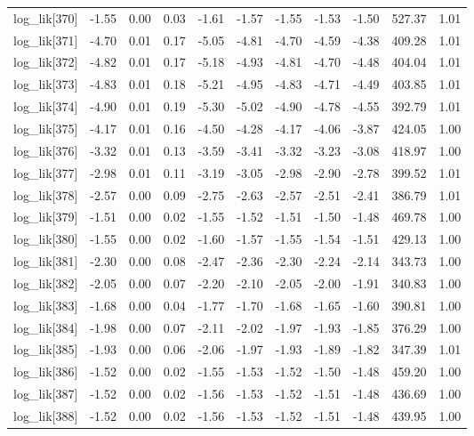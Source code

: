 \begin{table}[ht]
\begin{tabular}{rrrrrrrrrrr}
  log\_lik[370] & -1.55 & 0.00 & 0.03 & -1.61 & -1.57 & -1.55 & -1.53 & -1.50 & 527.37 & 1.01 \\ 
  log\_lik[371] & -4.70 & 0.01 & 0.17 & -5.05 & -4.81 & -4.70 & -4.59 & -4.38 & 409.28 & 1.01 \\ 
  log\_lik[372] & -4.82 & 0.01 & 0.17 & -5.18 & -4.93 & -4.81 & -4.70 & -4.48 & 404.04 & 1.01 \\ 
  log\_lik[373] & -4.83 & 0.01 & 0.18 & -5.21 & -4.95 & -4.83 & -4.71 & -4.49 & 403.85 & 1.01 \\ 
  log\_lik[374] & -4.90 & 0.01 & 0.19 & -5.30 & -5.02 & -4.90 & -4.78 & -4.55 & 392.79 & 1.01 \\ 
  log\_lik[375] & -4.17 & 0.01 & 0.16 & -4.50 & -4.28 & -4.17 & -4.06 & -3.87 & 424.05 & 1.00 \\ 
  log\_lik[376] & -3.32 & 0.01 & 0.13 & -3.59 & -3.41 & -3.32 & -3.23 & -3.08 & 418.97 & 1.00 \\ 
  log\_lik[377] & -2.98 & 0.01 & 0.11 & -3.19 & -3.05 & -2.98 & -2.90 & -2.78 & 399.52 & 1.01 \\ 
  log\_lik[378] & -2.57 & 0.00 & 0.09 & -2.75 & -2.63 & -2.57 & -2.51 & -2.41 & 386.79 & 1.01 \\ 
  log\_lik[379] & -1.51 & 0.00 & 0.02 & -1.55 & -1.52 & -1.51 & -1.50 & -1.48 & 469.78 & 1.00 \\ 
  log\_lik[380] & -1.55 & 0.00 & 0.02 & -1.60 & -1.57 & -1.55 & -1.54 & -1.51 & 429.13 & 1.00 \\ 
  log\_lik[381] & -2.30 & 0.00 & 0.08 & -2.47 & -2.36 & -2.30 & -2.24 & -2.14 & 343.73 & 1.00 \\ 
  log\_lik[382] & -2.05 & 0.00 & 0.07 & -2.20 & -2.10 & -2.05 & -2.00 & -1.91 & 340.83 & 1.00 \\ 
  log\_lik[383] & -1.68 & 0.00 & 0.04 & -1.77 & -1.70 & -1.68 & -1.65 & -1.60 & 390.81 & 1.00 \\ 
  log\_lik[384] & -1.98 & 0.00 & 0.07 & -2.11 & -2.02 & -1.97 & -1.93 & -1.85 & 376.29 & 1.00 \\ 
  log\_lik[385] & -1.93 & 0.00 & 0.06 & -2.06 & -1.97 & -1.93 & -1.89 & -1.82 & 347.39 & 1.01 \\ 
  log\_lik[386] & -1.52 & 0.00 & 0.02 & -1.55 & -1.53 & -1.52 & -1.50 & -1.48 & 459.20 & 1.00 \\ 
  log\_lik[387] & -1.52 & 0.00 & 0.02 & -1.56 & -1.53 & -1.52 & -1.51 & -1.48 & 436.69 & 1.00 \\ 
  log\_lik[388] & -1.52 & 0.00 & 0.02 & -1.56 & -1.53 & -1.52 & -1.51 & -1.48 & 439.95 & 1.00 \\ 

\end{tabular}
\end{table}
